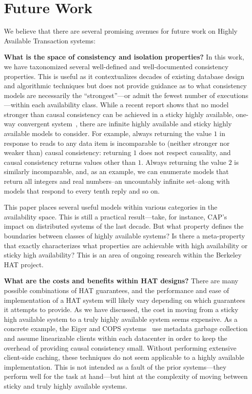 
\section{Future Work}
\label{sec:futurework}

We believe that there are several promising avenues for future work on
Highly Available Transaction systems:

\textbf{What is the space of consistency and isolation properties?} In
this work, we have taxonomized several well-defined and
well-documented consistency properties. This is useful as it
contextualizes decades of existing database design and algorithmic
techniques but does not provide guidance as to what consistency models
are necessarily the ``strongest''---or admit the fewest number of
executions---within each availability class. While a recent report
shows that no model stronger than causal consistency can be achieved
in a sticky highly available, one-way convergent system~\cite{cac},
there are infinite highly available and sticky highly available models
to consider. For example, always returning the value $1$ in response
to reads to any data item is incomparable to (neither stronger nor
weaker than) causal consistency: returning $1$ does not respect
causality, and causal consistency returns values other than
$1$. Always returning the value $2$ is similarly incomparable, and, as
an example, we can enumerate models that return all integers and real
numbers--an uncountably infinite set--along with models that respond
to every tenth reply and so on.

This paper places several useful models within various categories in
the availability space. This is still a practical result---take, for
instance, CAP's impact on distributed systems of the last decade. But
what property defines the boundaries between classes of highly
available systems? Is there a meta-property that exactly characterizes
what properties are achievable with high availability or sticky high
availability? This is an area of ongoing research within the Berkeley
HAT project.

\textbf{What are the costs and benefits within HAT designs?} There are
many possible combinations of HAT guarantees, and the performance and
ease of implementation of a HAT system will likely vary depending on
which guarantees it attempts to provide. As we have discussed, the
cost in moving from a sticky high available system to a truly highly
available system seems expensive. As a concrete example, the Eiger and
COPS systems~\cite{cops, eiger} use metadata garbage collection and
assume linearizable clients within each datacenter in order to keep
the overhead of providing causal consistency small. Without performing
extensive client-side caching, these techniques do not seem applicable
to a highly available implementation. This is not intended as a fault
of the prior systems---they perform well for the task at hand---but
hint at the complexity of moving between sticky and truly highly
available systems.

